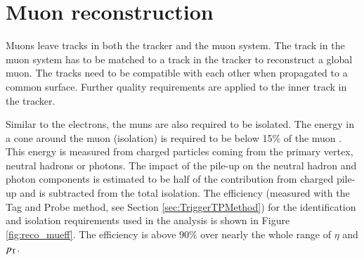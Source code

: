 \section{Muon reconstruction}
\label{sec:SimReco_Mu}


Muons leave tracks in both the tracker and the muon system. The track in the muon system has to be matched to a track in the tracker to reconstruct a global muon.
The tracks need to be compatible with each other when propagated to a common surface.
Further quality requirements are applied to the inner track in the tracker.

Similar to the electrons, the muns are also required to be isolated. The energy in a cone around the muon (isolation) is required to be below 15\% of the muon \pt.
This energy is measured from charged particles coming from the primary vertex, neutral hadrons or photons. The impact of the pile-up on the neutral hadron and photon components
is estimated to be half of the contribution from charged pile-up and is subtracted from the total isolation.
The efficiency (measured with the Tag and Probe method, see Section \ref{sec:TriggerTPMethod}) for the identification and isolation requirements used in the analysis is shown in Figure \ref{fig:reco_mueff}.
The efficiency is above $90\%$ over nearly the whole range of $\eta$ and $p_{\mathrm{T}}$.



